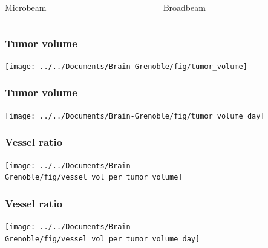 \documentclass{beamer}
\newcommand{\imsize}{\linewidth}
\newlength\imagewidth %
\newlength\imagescale %
\begin{document}
\begin{frame}
\begin{columns}
\begin{column}{0.33\paperwidth}
            Microbeam
		\end{column}
		\begin{column}{0.33\paperwidth}
            \pgfmathsetlength{\imagewidth}{\imsize}%
            \def\x{1001/3}%
            \def\y{978/3}%
            \centering

            Broadbeam
		\end{column}
	\end{columns}
\end{frame}

\renewcommand{\imsize}{0.8\textheight}
\begin{frame}
	\frametitle{Tumor volume}
	\texttt{[image: ../../Documents/Brain-Grenoble/fig/tumor\_volume]}
\end{frame}

\begin{frame}
	\frametitle{Tumor volume}
	\texttt{[image: ../../Documents/Brain-Grenoble/fig/tumor\_volume\_day]}
\end{frame}

\begin{frame}
	\frametitle{Vessel ratio}
	\texttt{[image: ../../Documents/Brain-Grenoble/fig/vessel\_vol\_per\_tumor\_volume]}
\end{frame}

\begin{frame}
	\frametitle{Vessel ratio}
	\texttt{[image: ../../Documents/Brain-Grenoble/fig/vessel\_vol\_per\_tumor\_volume\_day]}
\end{frame}
\end{document}

